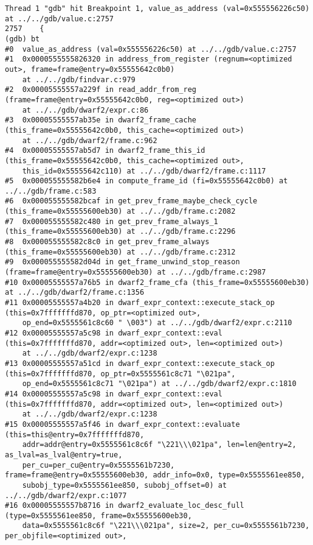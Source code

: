 \documentclass{report}
\begin{document}
\begin{verbatim}
Thread 1 "gdb" hit Breakpoint 1, value_as_address (val=0x555556226c50) at ../../gdb/value.c:2757
2757	{
(gdb) bt
#0  value_as_address (val=0x555556226c50) at ../../gdb/value.c:2757
#1  0x0000555555826320 in address_from_register (regnum=<optimized out>, frame=frame@entry=0x55555642c0b0)
    at ../../gdb/findvar.c:979
#2  0x00005555557a229f in read_addr_from_reg (frame=frame@entry=0x55555642c0b0, reg=<optimized out>)
    at ../../gdb/dwarf2/expr.c:86
#3  0x00005555557ab35e in dwarf2_frame_cache (this_frame=0x55555642c0b0, this_cache=<optimized out>)
    at ../../gdb/dwarf2/frame.c:962
#4  0x00005555557ab5d7 in dwarf2_frame_this_id (this_frame=0x55555642c0b0, this_cache=<optimized out>, 
    this_id=0x55555642c110) at ../../gdb/dwarf2/frame.c:1117
#5  0x000055555582b6e4 in compute_frame_id (fi=0x55555642c0b0) at ../../gdb/frame.c:583
#6  0x000055555582bcaf in get_prev_frame_maybe_check_cycle (this_frame=0x55555600eb30) at ../../gdb/frame.c:2082
#7  0x000055555582c480 in get_prev_frame_always_1 (this_frame=0x55555600eb30) at ../../gdb/frame.c:2296
#8  0x000055555582c8c0 in get_prev_frame_always (this_frame=0x55555600eb30) at ../../gdb/frame.c:2312
#9  0x000055555582d04d in get_frame_unwind_stop_reason (frame=frame@entry=0x55555600eb30) at ../../gdb/frame.c:2987
#10 0x00005555557a76b5 in dwarf2_frame_cfa (this_frame=0x55555600eb30) at ../../gdb/dwarf2/frame.c:1356
#11 0x00005555557a4b20 in dwarf_expr_context::execute_stack_op (this=0x7fffffffd870, op_ptr=<optimized out>, 
    op_end=0x5555561c8c60 " \003") at ../../gdb/dwarf2/expr.c:2110
#12 0x00005555557a5c98 in dwarf_expr_context::eval (this=0x7fffffffd870, addr=<optimized out>, len=<optimized out>)
    at ../../gdb/dwarf2/expr.c:1238
#13 0x00005555557a51cd in dwarf_expr_context::execute_stack_op (this=0x7fffffffd870, op_ptr=0x5555561c8c71 "\021pa", 
    op_end=0x5555561c8c71 "\021pa") at ../../gdb/dwarf2/expr.c:1810
#14 0x00005555557a5c98 in dwarf_expr_context::eval (this=0x7fffffffd870, addr=<optimized out>, len=<optimized out>)
    at ../../gdb/dwarf2/expr.c:1238
#15 0x00005555557a5f46 in dwarf_expr_context::evaluate (this=this@entry=0x7fffffffd870, 
    addr=addr@entry=0x5555561c8c6f "\221\\\021pa", len=len@entry=2, as_lval=as_lval@entry=true, 
    per_cu=per_cu@entry=0x5555561b7230, frame=frame@entry=0x55555600eb30, addr_info=0x0, type=0x5555561ee850, 
    subobj_type=0x5555561ee850, subobj_offset=0) at ../../gdb/dwarf2/expr.c:1077
#16 0x00005555557b8716 in dwarf2_evaluate_loc_desc_full (type=0x5555561ee850, frame=0x55555600eb30, 
    data=0x5555561c8c6f "\221\\\021pa", size=2, per_cu=0x5555561b7230, per_objfile=<optimized out>, 

\end{verbatim}
\end{document}
